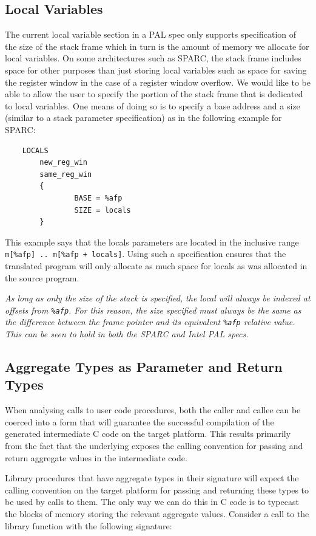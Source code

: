 \subsection{Local Variables}
The current local variable section in a PAL spec only supports
specification of the size of the stack frame which in turn is
the amount of memory we allocate for local variables. On some
architectures such as SPARC, the stack frame includes space for
other purposes than just storing local variables such as space
for saving the register window in the case of a register window
overflow. We would like to be able to allow the user to
specify the portion of the stack frame that is dedicated to local
variables. One means of doing so is to specify a base address and a
size (similar to a stack parameter specification) as in the following
example for SPARC:

\begin{verbatim}
    LOCALS
        new_reg_win
        same_reg_win
        {
                BASE = %afp
                SIZE = locals
        }
\end{verbatim}

This example says that the locals parameters are located in the
inclusive range {\tt m[\%afp] .. m[\%afp + locals]}. Using such a
specification ensures that the translated program will only allocate
as much space for locals as was allocated in the source program.

{\it As long as only the size of the stack is specified, the local will
always be indexed at offsets from {\tt \%afp}. For this reason, the
size specified must always be the same as the difference between the
frame pointer and its equivalent {\tt \%afp} relative value. This can
be seen to hold in both the SPARC and Intel PAL specs.}


\subsection{Aggregate Types as Parameter and Return Types}
When analysing calls to user code procedures, both the caller
and callee can be coerced into a form that will guarantee the
successful compilation of the generated intermediate C code on
the target platform. This results primarily from the fact that the
underlying exposes the calling convention for passing and return
aggregate values in the intermediate code.

Library procedures that have aggregate types in their signature will
expect the calling convention on the target platform for passing
and returning these types to be used by calls to them. The only
way we can do this in C code is to typecast the blocks of memory
storing the relevant aggregate values. Consider a call to the
library function with the following signature:

